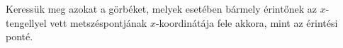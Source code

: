 Keressük meg azokat a görbéket, melyek esetében bármely érintőnek az 
$x$-tengellyel vett metszéspontjának $x$-koordinátája fele akkora, 
mint az érintési ponté.


